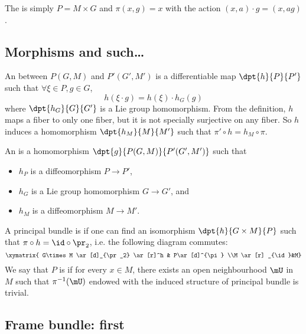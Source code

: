 The  is simply $P=M\times G$ and $\pi(x,g)=x$ with the action $(x,a)\cdot g=(x,ag)$.

\subsection{Morphisms and such\texorpdfstring{\ldots}{...}}

An  between $P(G,M)$ and $P'(G',M')$ is a differentiable map $\dpt{h}{P}{P'}$ such that $\forall \xi\in P,g\in G$,
\begin{equation}\label{eq:def_princ_homo}
	h(\xi\cdot g)=h(\xi)\cdot h_G(g)
\end{equation}
where $\dpt{h_G}{G}{G'}$ is a Lie group homomorphism. From the definition, $h$ maps a fiber to only one fiber, but it is not specially surjective on any fiber. So $h$ induces a homomorphism $\dpt{h_M}{M}{M'}$ such that $\pi'\circ h=h_M\circ\pi$.

An  is a homomorphism $\dpt{g}{P(G,M)}{P'(G',M')}$ such that

\begin{itemize}
	\item $h_P$ is a diffeomorphism $P\to P'$,
	\item $h_G$ is a Lie group homomorphism $G\to G'$, and
	\item $h_M$ is a diffeomorphism $M\to M'$.
\end{itemize}

A principal bundle is  if one can find an isomorphism $\dpt{h}{G\times M}{P}$ such that $\pi\circ h=\id\circ\pr_2$, i.e. the following diagram commutes:
\begin{equation}\label{diag:princ_triv}
	\xymatrix{ G\times M \ar[d]_{\pr_2} \ar[r]^h & P\ar[d]^{\pi} \\M \ar[r] _{\id}&M}
\end{equation}
We say that $P$ is  if for every $x\in M$, there exists an open neighbourhood $\mU$ in $M$ such that $\pi^{-1}(\mU)$ endowed with the induced structure of principal bundle is trivial.

\subsection{Frame bundle: first}\label{pg:frame_bundle}

